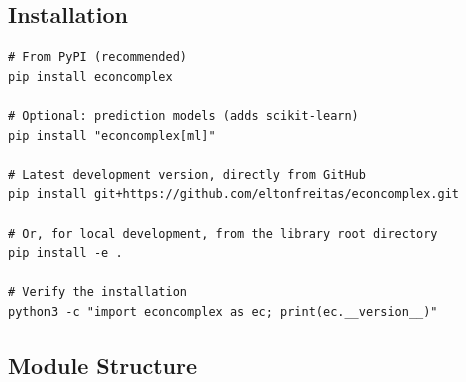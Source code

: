 \documentclass[12pt, a4paper]{article}
\begin{document}
\subsection{Installation}

\begin{lstlisting}[style=bashstyle,
  caption={Installation via pip}]
# From PyPI (recommended)
pip install econcomplex

# Optional: prediction models (adds scikit-learn)
pip install "econcomplex[ml]"

# Latest development version, directly from GitHub
pip install git+https://github.com/eltonfreitas/econcomplex.git

# Or, for local development, from the library root directory
pip install -e .

# Verify the installation
python3 -c "import econcomplex as ec; print(ec.__version__)"
\end{lstlisting}

\subsection{Module Structure}
\end{document}
